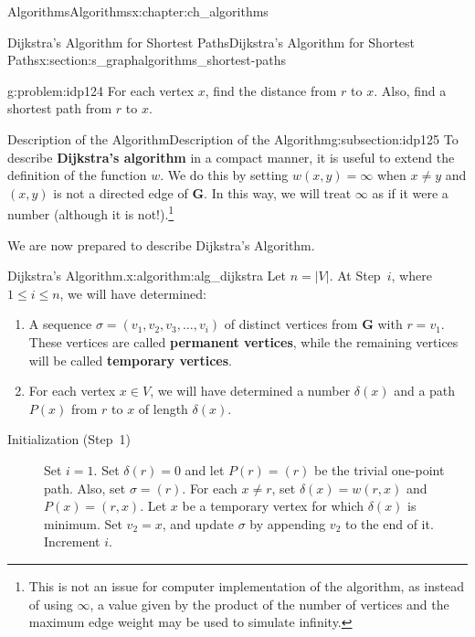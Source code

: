 \documentclass[oneside,10pt,]{book}
\newcommand{\terminology}[1]{\textbf{#1}}
\numberwithin{equation}{section}
\newcommand{\bfG}{\mathbf{G}}
\begin{document}
\begin{chapterptx}{Algorithms}{}{Algorithms}{}{}{x:chapter:ch_algorithms}
\begin{sectionptx}{Dijkstra's Algorithm for Shortest Paths}{}{Dijkstra's Algorithm for Shortest Paths}{}{}{x:section:s_graphalgorithms_shortest-paths}
\begin{introduction}{}
\begin{problem}{}{g:problem:idp124}%
For each vertex \(x\), find the distance from \(r\) to \(x\). Also, find a shortest path from \(r\) to \(x\).%
\end{problem}
\end{introduction}%
%
%
\typeout{************************************************}
\typeout{************************************************}
%
\begin{subsectionptx}{Description of the Algorithm}{}{Description of the Algorithm}{}{}{g:subsection:idp125}
To describe \terminology{Dijkstra's algorithm} in a compact manner, it is useful to extend the definition of the function \(w\). We do this by setting \(w(x,y)=\infty\) when \(x\neq y\) and \((x,y)\) is not a directed edge of \(\bfG\). In this way, we will treat \(\infty\) as if it were a number (although it is not!).\footnote{This is not an issue for computer implementation of the algorithm, as instead of using \(\infty\), a value given by the product of the number of vertices and the maximum edge weight may be used to simulate infinity.\label{g:fn:idp126}}%
\par
We are now prepared to describe Dijkstra's Algorithm.%
\begin{algorithm}{Dijkstra's Algorithm.}{}{x:algorithm:alg_dijkstra}%
%
%
Let \(n=|V|\). At Step~\(i\), where \(1\le i\le n\), we will have determined:%
\begin{enumerate}
\item{}A sequence \(\sigma=(v_1,v_2,v_3,\dots,v_i)\) of distinct vertices from \(\bfG\) with \(r=v_1\).  These vertices are called \terminology{permanent vertices}, while the remaining vertices will be called \terminology{temporary vertices}.%
\item{}For each vertex \(x\in V\), we will have determined a number \(\delta(x)\) and a path \(P(x)\) from \(r\) to \(x\) of length \(\delta(x)\).%
\end{enumerate}
%
\begin{description}
\item[{Initialization (Step~1)}]Set \(i=1\). Set \(\delta(r)=0\) and let \(P(r)=(r)\) be the trivial one-point path. Also, set \(\sigma= (r)\). For each \(x\neq r\), set \(\delta(x)= w(r,x)\) and \(P(x)=(r,x)\). Let \(x\) be a temporary vertex for which \(\delta(x)\) is minimum. Set \(v_2 = x\), and update \(\sigma\) by appending \(v_2\) to the end of it. Increment \(i\).%

\end{description}
\end{algorithm}
\end{subsectionptx}
\end{sectionptx}
\end{chapterptx}
\end{document}
